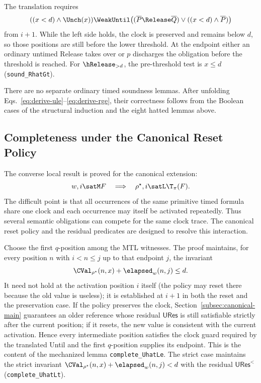 The translation requires
\[
  ((x<d)\land\Unch(x))
  \WeakUntil
  \bigl((\overline{P}\Release \overline{Q})\lor((x<d)\land \overline{P})\bigr)
\]
from $i+1$.  While the left side holds, the clock is preserved and remains
below $d$, so those positions are still before the lower threshold.  At the
endpoint either an ordinary untimed Release takes over or $p$ discharges the
obligation before the threshold is reached.  For $\hRelease_{>d}$, the
pre-threshold test is $x\le d$ (\texttt{sound\_\allowbreak{}RhatGt}).

There are no separate ordinary timed soundness lemmas.  After unfolding
Eqs.~\eqref{eq:derive-ule}--\eqref{eq:derive-rge}, their
correctness follows from the Boolean cases of the structural induction and the
eight hatted lemmas above.

\subsection{Completeness under the Canonical Reset Policy}
\label{subsec:timed-completeness}

The converse local result is proved for the canonical extension:
\[
  w,i\satM F
  \quad\Longrightarrow\quad
  \rho^\star,i\satL\T_\pi(F).
\]
The difficult point is that all occurrences of the same primitive timed formula
share one clock and each occurrence may itself be activated repeatedly.  Thus
several semantic obligations can compete for the same clock trace.  The
canonical reset policy and the residual predicates are designed to resolve
this interaction.

Choose the first $q$-position among the MTL witnesses.  The proof maintains,
for every position $n$ with $i<n\le j$ up to that endpoint $j$, the invariant
\[
  \CVal_{\rho^\star}(n,x)+\elapsed_w(n,j)\le d.
\]
It need not hold at the activation position $i$ itself (the policy may reset
there because the old value is useless); it is established at $i+1$ in both
the reset and the preservation case.
If the policy preserves the clock, Section~\ref{subsec:canonical-main}
guarantees an older reference whose residual $\mathsf{URes}$ is still
satisfiable strictly after the current position; if it resets, the new value is
consistent with the current activation.  Hence every intermediate position satisfies the clock
guard required by the translated Until and the first $q$-position supplies its
endpoint.  This is the content of the mechanized lemma
\texttt{complete\_\allowbreak{}UhatLe}.  The strict case maintains the strict
invariant $\CVal_{\rho^\star}(n,x)+\elapsed_w(n,j)<d$ with the residual
$\mathsf{URes}^{<}$ (\texttt{complete\_\allowbreak{}UhatLt}).

